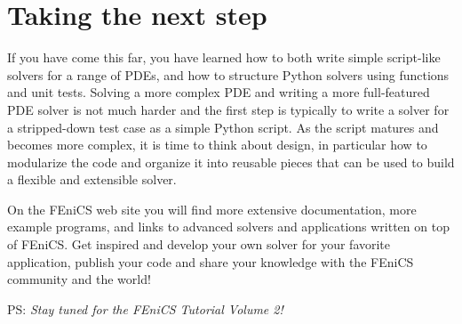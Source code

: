\documentclass[graybox,envcountchap,sectrefs,final]{svmonodo}
\makeatletter
\def\cleardoublepage{\clearpage\if@twoside \ifodd\c@page\else
\hbox{}
\thispagestyle{empty}
\newpage
\if@twocolumn\hbox{}\newpage\fi\fi\fi}
\makeatother
\begin{document}





\section{Taking the next step}

If you have come this far, you have learned how to both write simple
script-like solvers for a range of PDEs, and how to structure Python
solvers using functions and unit tests. Solving a more complex PDE
and writing a more full-featured PDE solver is not much harder and the
first step is typically to write a solver for a stripped-down test
case as a simple Python script. As the script matures and becomes more
complex, it is time to think about design, in particular how to
modularize the code and organize it into reusable pieces that can be
used to build a flexible and extensible solver.

On the FEniCS web site you will find more extensive documentation,
more example programs, and links to advanced solvers and applications
written on top of FEniCS. Get inspired and develop your own solver
for your favorite application, publish your code and share your
knowledge with the FEniCS community and the world!

PS: \emph{Stay tuned for the FEniCS Tutorial Volume 2!}


\clearemptydoublepage
{}
\thispagestyle{empty}






\backmatter

\cleardoublepage{}  %
\printindex
\end{document}
